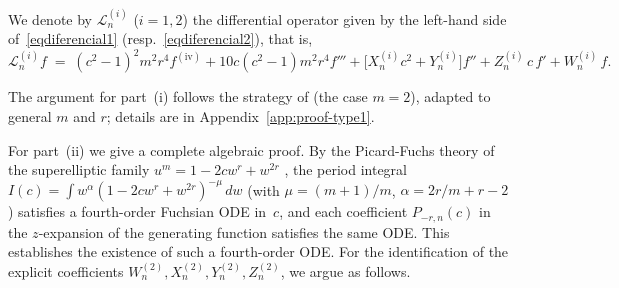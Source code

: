 \documentclass[final,nopreprintline]{elsarticle}
\theoremstyle{definition}
\numberwithin{equation}{section}
\theoremstyle{remark}
\newtheorem{remark}[theorem]{Remark}
\begin{document}
We denote by $\mathcal{L}^{(i)}_n$ ($i=1,2$) the differential operator given by the
left-hand side of~\eqref{eqdiferencial1} (resp.\ \eqref{eqdiferencial2}), that is,
\begin{equation}\label{eq:operator-def}
\mathcal{L}^{(i)}_n f \;=\;
(c^2-1)^2 m^2 r^4 f^{(\mathrm{iv})}
+10c(c^2-1)m^2 r^4 f'''
+\bigl[X^{(i)}_n c^2 + Y^{(i)}_n\bigr]f''
+ Z^{(i)}_n\,c\,f'
+ W^{(i)}_n\,f.
\end{equation}


The argument for part~(i) follows the strategy of
\cite[Thm.~3.1.1]{Cox2013DJKMPolynomials} (the case $m=2$), adapted to general $m$
and $r$; details are in Appendix~\ref{app:proof-type1}.

For part~(ii) we give a complete algebraic proof.
By the Picard-Fuchs theory of the superelliptic family
$u^m=1-2cw^r+w^{2r}$ \cite{Griffiths1969,Dimca1992},
the period integral $I(c)=\int w^\alpha(1-2cw^r+w^{2r})^{-\mu}\,dw$
(with $\mu=(m+1)/m$, $\alpha=2r/m+r-2$) satisfies a fourth-order Fuchsian ODE in~$c$,
and each coefficient $P_{-r,n}(c)$ in the $z$-expansion of the generating function
satisfies the same ODE.
This establishes the existence of such a fourth-order ODE.
For the identification of the explicit coefficients $W^{(2)}_n,X^{(2)}_n,Y^{(2)}_n,Z^{(2)}_n$, we argue as follows.
\end{document}
